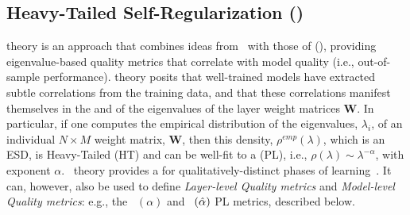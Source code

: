 \subsection{Heavy-Tailed Self-Regularization (\HTSR)}





\HTSR theory is an approach that combines ideas from \STATMECH~with those of \emph{\HeavyTailed} \emph{\RandomMatrixTheory} (\RMT),
providing eigenvalue-based quality metrics that correlate with model quality (i.e., out-of-sample performance).
\HTSR theory posits that well-trained models have extracted subtle correlations from the training data, and that these correlations manifest themselves in the \SHAPE and \SCALE of the eigenvalues of the layer weight matrices $\mathbf{W}$. 
In particular, if one computes the empirical distribution of the eigenvalues, $\lambda_i$, of an individual  $N \times M$ weight matrix, $\mathbf{W}$, then this density, $\rho^{emp}(\lambda)$, which is an ESD, is Heavy-Tailed (HT) and can be well-fit to a \emph{\PowerLaw} (PL), i.e., $\rho(\lambda)\sim\lambda^{-\alpha}$, with exponent $\alpha$.
\HTSR~theory provides a \emph{\Phenomenology} for qualitatively-distinct phases of learning~\cite{MM18_TR_JMLRversion}.
It can, however, also be used to define \emph{Layer-level Quality metrics} and \emph{Model-level Quality metrics}: e.g., the \ALPHA~$(\alpha)$ and \ALPHAHAT~$(\hat\alpha)$ PL metrics, described below.

